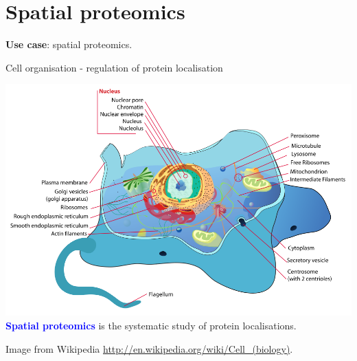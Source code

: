 \section{Spatial proteomics}

\begin{frame}{}
  \begin{center}
    \Large{\textbf{Use case}: spatial proteomics.}
  \end{center}
\end{frame}


\begin{frame}{Cell organisation - regulation of protein localisation}
  \begin{center}
    \includegraphics[width=1\linewidth]{figs/Animal_cell_structure.png} \\
    \textbf{\textcolor{Blue}{Spatial proteomics}} is the systematic
    study of protein localisations.
  \end{center}

  \tiny Image from Wikipedia
  \url{http://en.wikipedia.org/wiki/Cell_(biology)}.
\end{frame}


